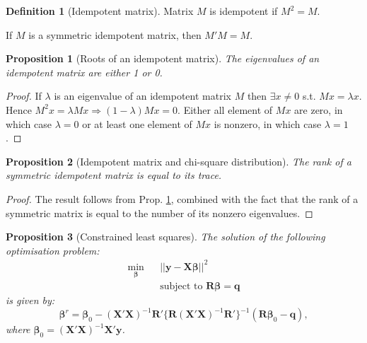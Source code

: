 \documentclass[
  12pt,
]{book}
\newtheorem{proposition}{Proposition}[chapter]
\theoremstyle{definition}
\newtheorem{definition}{Definition}[chapter]
\theoremstyle{definition}
\theoremstyle{definition}
\theoremstyle{definition}
\theoremstyle{remark}
\begin{document}
\begin{definition}[Idempotent matrix]
\protect\hypertarget{def:idempotent}{}\label{def:idempotent}Matrix \(M\) is idempotent if \(M^2=M\).

If \(M\) is a symmetric idempotent matrix, then \(M'M=M\).
\end{definition}

\begin{proposition}[Roots of an idempotent matrix]
\protect\hypertarget{prp:rootsidempotent}{}\label{prp:rootsidempotent}The eigenvalues of an idempotent matrix are either 1 or 0.
\end{proposition}

\begin{proof}
If \(\lambda\) is an eigenvalue of an idempotent matrix \(M\) then \(\exists x \ne 0\) s.t. \(Mx=\lambda x\). Hence \(M^2x=\lambda M x \Rightarrow (1-\lambda)Mx=0\). Either all element of \(Mx\) are zero, in which case \(\lambda=0\) or at least one element of \(Mx\) is nonzero, in which case \(\lambda=1\).
\end{proof}

\begin{proposition}[Idempotent matrix and chi-square distribution]
\protect\hypertarget{prp:chi2idempotent}{}\label{prp:chi2idempotent}The rank of a symmetric idempotent matrix is equal to its trace.
\end{proposition}

\begin{proof}
The result follows from Prop. \ref{prp:rootsidempotent}, combined with the fact that the rank of a symmetric matrix is equal to the number of its nonzero eigenvalues.
\end{proof}

\begin{proposition}[Constrained least squares]
\protect\hypertarget{prp:constrainedLS}{}\label{prp:constrainedLS}The solution of the following optimisation problem:
\begin{eqnarray*}
\underset{\boldsymbol\beta}{\min} && || \mathbf{y} - \mathbf{X}\boldsymbol\beta ||^2 \\
&& \mbox{subject to } \mathbf{R}\boldsymbol\beta = \mathbf{q}
\end{eqnarray*}
is given by:
\[
\boxed{\boldsymbol\beta^r = \boldsymbol\beta_0 - (\mathbf{X}'\mathbf{X})^{-1} \mathbf{R}'\{\mathbf{R}(\mathbf{X}'\mathbf{X})^{-1}\mathbf{R}'\}^{-1}(\mathbf{R}\boldsymbol\beta_0 - \mathbf{q}),}
\]
where \(\boldsymbol\beta_0=(\mathbf{X}'\mathbf{X})^{-1}\mathbf{X}'\mathbf{y}\).
\end{proposition}
\end{document}
